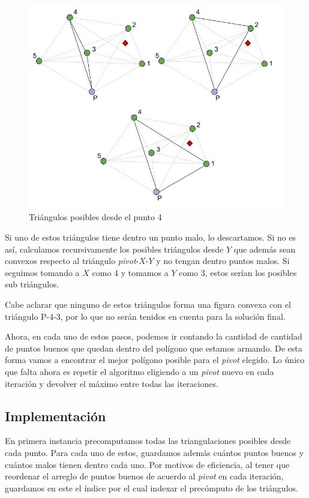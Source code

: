\begin{figure}[H]\centering\includegraphics[scale=0.5]{Imagenes/ej3/Imagen_E.jpg}\caption{Triángulos posibles desde el punto 4}\end{figure}

Si uno de estos triángulos tiene dentro un punto malo, lo descartamos. Si no es así, calculamos recursivamente los posibles triángulos desde $Y$ que además sean convexos respecto al triángulo \textit{pivot}-$X$-$Y$ y no tengan dentro puntos malos. Si seguimos tomando a $X$ como 4 y tomamos a $Y$ como 3, estos serían los posibles sub triángulos.


Cabe aclarar que ninguno de estos triángulos forma una figura convexa con el triángulo P-4-3, por lo que no serán tenidos en cuenta para la solución final.

Ahora, en cada uno de estos pasos, podemos ir contando la cantidad de cantidad de puntos buenos que quedan dentro del polígono que estamos armando. De esta forma vamos a encontrar el mejor polígono posible para el \textit{pivot} elegido. Lo único que falta ahora es repetir el algoritmo eligiendo a un \textit{pivot} nuevo en cada iteración y devolver el máximo entre todas las iteraciones.

\subsection{Implementación}
En primera instancia precomputamos todas las triangulaciones posibles desde cada punto. Para cada uno de estos, guardamos además cuántos puntos buenos y cuántos malos tienen dentro cada uno. Por motivos de eficiencia, al tener que reordenar el arreglo de puntos buenos de acuerdo al \textit{pivot} en cada iteración, guardamos en este el índice por el cual indexar el precómputo de los triángulos.

